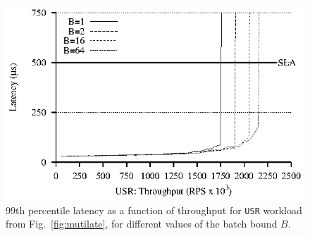 \begin{figure}
\begin{centering}
\includegraphics{figs/batch-mutilate.eps}
\caption{99th percentile latency as a function of throughput for \texttt{USR} workload from Fig.~\ref{fig:mutilate}, for different values of the batch bound $B$.}
\label{fig:batch-mutilate}
\end{centering}
\end{figure}

